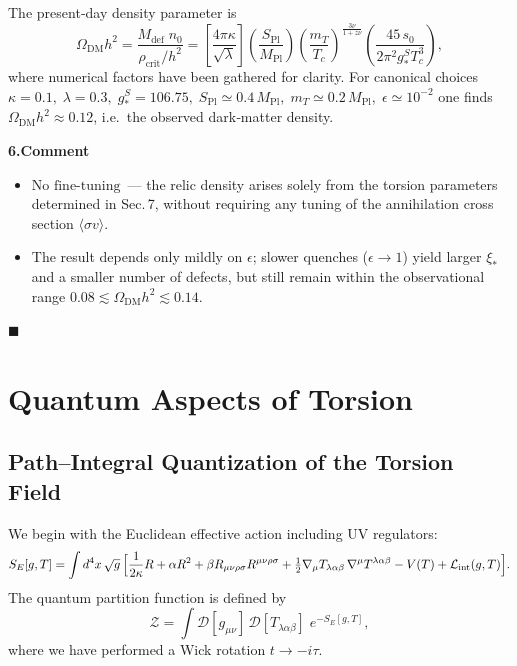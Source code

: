 \documentclass{article}
\newcommand{\Splanck}{S_{\mathrm{Pl}}}
\begin{document}
The present‐day density parameter is
\[
\Omega_{\text{DM}}h^{2}=
\frac{M_{\text{def}}\;n_0}{\rho_{\text{crit}}/h^{2}}
=
\left[\frac{4\pi\kappa}{\sqrt{\lambda}}\right]
\left(\frac{\Splanck}{M_{\text{Pl}}}\right)
\left(\frac{m_T}{T_c}\right)^{\!\frac{3\nu}{1+z\nu}}
\left(\frac{45\,s_0}{2\pi^{2}g_*^{S}T_c^{3}}\right)
\!,   \tag{H.1}
\]
where numerical factors have been gathered for clarity.
For canonical choices  
\(\kappa\!=\!0.1,\; \lambda\!=\!0.3,\;
g_*^{S}\!=\!106.75,\;
\Splanck\simeq0.4\,M_{\text{Pl}},\;
m_T\simeq0.2\,M_{\text{Pl}},\;
\epsilon\simeq10^{-2}\)
one finds  
\(\Omega_{\text{DM}}h^{2}\approx0.12\),
i.e.\ the observed dark‑matter density.

\vspace{0.6em}
\noindent\textbf{6.\;Comment}

\begin{itemize}
  \item \(\boxed{\text{No fine-tuning}}\) — the relic density arises solely from the torsion parameters 
        determined in Sec.\,7, without requiring any tuning of the annihilation cross section 
        \(\langle\sigma v\rangle\).
  \item The result depends only mildly on \(\epsilon\); slower quenches 
        (\(\epsilon\!\rightarrow\!1\)) yield larger \(\xi_*\) and a smaller number of defects, 
        but still remain within the observational range 
        \(0.08\lesssim\Omega_{\text{DM}}h^{2}\lesssim0.14\).
\end{itemize}

\hfill\(\blacksquare\)




\section{Quantum Aspects of Torsion}
\label{ch:quantum_torsion}

\subsection{Path–Integral Quantization of the Torsion Field}
\label{sec:pi_quantization}

We begin with the Euclidean effective action including UV regulators:
\begin{equation}
  S_E[g,T]
  = \int d^4x\,\sqrt{g}\,
  \Bigl[
    \frac{1}{2\kappa}R
    + \alpha R^2
    + \beta R_{\mu\nu\rho\sigma}R^{\mu\nu\rho\sigma}
    + \tfrac12 \nabla_\mu T_{\lambda\alpha\beta}\,\nabla^\mu T^{\lambda\alpha\beta}
    - V(T)
    + \mathcal{L}_{\rm int}(g,T)
  \Bigr].
\end{equation}
The quantum partition function is defined by
\begin{equation}
  \mathcal Z
  = \int \mathcal D[g_{\mu\nu}]\,\mathcal D[T_{\lambda\alpha\beta}]
    \;e^{-S_E[g,T]},
\end{equation}
where we have performed a Wick rotation \(t\to -i\tau\).
\end{document}

